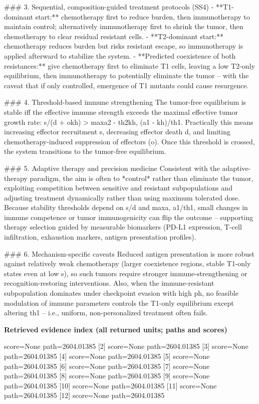 \documentclass[10pt]{article}
\begin{document}
\begin{AnswerText}
### 3. Sequential, composition-guided treatment protocols (SS4)
- **T1-dominant start:** chemotherapy first to reduce burden, then immunotherapy to maintain control; alternatively immunotherapy first to shrink the tumor, then chemotherapy to clear residual resistant cells.
- **T2-dominant start:** chemotherapy reduces burden but risks resistant escape, so immunotherapy is applied afterward to stabilize the system.
- **Predicted coexistence of both resistances:** give chemotherapy first to eliminate T1 cells, leaving a low T2-only equilibrium, then immunotherapy to potentially eliminate the tumor -- with the caveat that if only controlled, emergence of T1 mutants could cause resurgence.

### 4. Threshold-based immune strengthening
The tumor-free equilibrium is stable iff the effective immune strength exceeds the maximal effective tumor growth rate:
s/(d + okh) > max{a2 - th2kh, (a1 - kh)/th1}.
Practically this means increasing effector recruitment s, decreasing effector death d, and limiting chemotherapy-induced suppression of effectors (o). Once this threshold is crossed, the system transitions to the tumor-free equilibrium.

### 5. Adaptive therapy and precision medicine
Consistent with the adaptive-therapy paradigm, the aim is often to *control* rather than eliminate the tumor, exploiting competition between sensitive and resistant subpopulations and adjusting treatment dynamically rather than using maximum tolerated dose. Because stability thresholds depend on s/d and max{a, a1/th1}, small changes in immune competence or tumor immunogenicity can flip the outcome -- supporting therapy selection guided by measurable biomarkers (PD-L1 expression, T-cell infiltration, exhaustion markers, antigen presentation profiles).

### 6. Mechanism-specific caveats
Reduced antigen presentation is more robust against relatively weak chemotherapy (larger coexistence regions, stable T1-only states even at low s), so such tumors require stronger immune-strengthening or recognition-restoring interventions. Also, when the immune-resistant subpopulation dominates under checkpoint evasion with high ph, no feasible modulation of immune parameters controls the T1-only equilibrium except altering th1 -- i.e., uniform, non-personalized treatment often fails.
\end{AnswerText}

\textbf{Retrieved evidence index (all returned units; paths and scores) }
\begin{EvidenceText}
[1] score=None path=2604.01385
[2] score=None path=2604.01385
[3] score=None path=2604.01385
[4] score=None path=2604.01385
[5] score=None path=2604.01385
[6] score=None path=2604.01385
[7] score=None path=2604.01385
[8] score=None path=2604.01385
[9] score=None path=2604.01385
[10] score=None path=2604.01385
[11] score=None path=2604.01385
[12] score=None path=2604.01385
\end{EvidenceText}
\end{document}
